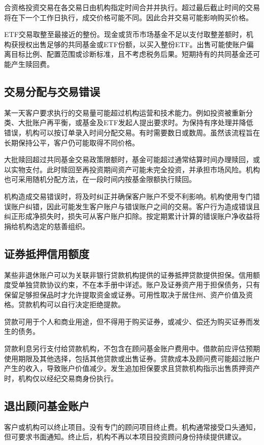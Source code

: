 \documentclass[UTF8,fontset=none,11pt,a4paper]{ctexart}
\begin{document}
合资格投资交易在各交易日由机构指定时间合并并执行。超过最后截止时间的交易将在下一个工作日执行，成交价格可能不同。因此合并交易可能影响\allowbreak\mbox{购买价格。}


ETF交易取整至最接近的整份。现金或货币市场基金不足以支付取整差额时，机构获授权出售足够的共同基金或ETF份额，以买入整份ETF。出售可能使账户偏离目标比例、配置范围或诊断标准，且不考虑税务后果。短期持有的共同基金还可能产\allowbreak\mbox{生赎回费。}


\subsection*{交易分配与交易错误}
某一天客户要求执行的交易量可能超过机构运营和技术能力。例如投资被重新分类、大批账户再平衡，或基金及ETF发起人提出要求时。为保持有序处理并降低错误，机构可以按订单录入时间分配交易。有时需要数日或数周。虽然该流程旨在长期保持公平，客户仍可能取得\allowbreak\mbox{不同价格。}


大批赎回超过共同基金交易政策限额时，基金可能超过通常结算时间办理赎回，或以实物支付。此时赎回至再投资期间资产可能未完全投资，并承担市场风险。机构也可采用随机分配方法，在一段时间内按基金限额\allowbreak\mbox{执行赎回。}


机构造成交易错误时，将及时纠正并确保客户账户不受不利影响。机构使用专门错误账户纠错，因此可能发生客户账户与错误账户之间的交易。客户行为造成错误且纠正形成净损失时，损失可从客户账户扣除。按定期累计计算的错误账户净收益将捐给机构选定的\allowbreak\mbox{慈善组织。}


\subsection*{证券抵押信用额度}
某些非退休账户可以为关联非银行贷款机构提供的证券抵押贷款提供担保。信用额度受单独贷款协议约束，不在本手册中详述。账户及证券资产用于担保债务，只有保留足够担保品时才允许提取资金或证券。可用性取决于居住州、资产价值及资格。贷款机构可以自行决定\allowbreak\mbox{拒绝提款。}


贷款可用于个人和商业用途，但不得用于购买证券，或减少、偿还为购买证券而发\allowbreak\mbox{生的债务。}


贷款利息另行支付给贷款机构，不包含在顾问基金账户费用中。借款前应评估预期使用期限及其他选择，包括其他贷款或出售证券。贷款成本及顾问费可能超过账户产生的收入，导致账户价值减少。发生追加担保要求且贷款机构指示出售质押资产时，机构仅以经纪交易商\allowbreak\mbox{身份执行。}


\subsection*{退出顾问基金账户}
客户或机构可以终止项目。没有专门的顾问项目终止费。机构通常接受口头通知，但可要求书面通知。终止后，机构不再以本项目投资顾问身份持续\allowbreak\mbox{提供建议。}
\end{document}
